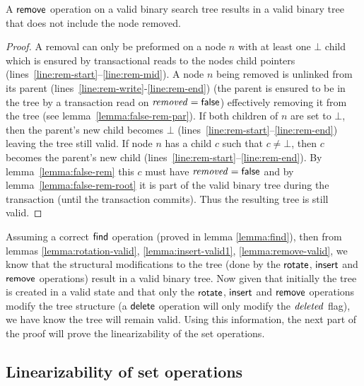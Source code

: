 \begin{lemma}
\label{lemma:remove-valid}
A $\act{remove}$ operation on a valid binary search tree results in a valid binary tree that does not include the node removed.
\end{lemma}
\begin{proof}
A removal can only be preformed on a node $n$ with at least one $\bot$ child which is ensured by transactional reads to the
nodes child pointers (lines~\ref{line:rem-start}--\ref{line:rem-mid}).
A node $n$ being removed is unlinked from its parent (lines~\ref{line:rem-write}-\ref{line:rem-end})
(the parent is ensured to be in the tree by a transaction read on $\ms{removed}=\lit{false}$) effectively removing it from the tree (see lemma~\ref{lemma:false-rem-par}).
If both children of $n$ are set to $\bot$, then the parent's new child becomes $\bot$ (lines~\ref{line:rem-start}--\ref{line:rem-end}) leaving the tree still valid.
If node $n$ has a child $c$ such that $c\neq \bot$, then $c$ becomes the parent's new child 
(lines~\ref{line:rem-start}--\ref{line:rem-end}).
By lemma~\ref{lemma:false-rem} this $c$ must have $\ms{removed}=\lit{false}$ and by lemma~\ref{lemma:false-rem-root} it is part of the valid binary tree during the transaction (until the transaction commits).
Thus the resulting tree is still valid.
\end{proof}


Assuming a correct $\act{find}$ operation (proved in lemma \ref{lemma:find}), then from lemmas \ref{lemma:rotation-valid}, \ref{lemma:insert-valid1}, \ref{lemma:remove-valid},
we know that the structural modifications to the tree (done by the $\act{rotate}$, $\act{insert}$ and $\act{remove}$ operations)
result in a valid binary tree.
Now given that initially the tree is created in a valid state
and that only the $\act{rotate}$, $\act{insert}$ and $\act{remove}$ operations modify the tree structure (a $\act{delete}$ operation
will only modify the $\ms{deleted}$ flag), we have know the tree will remain valid.
Using this information, the next part of the proof will prove the linearizability of the set operations.


\subsection{Linearizability of set operations}


